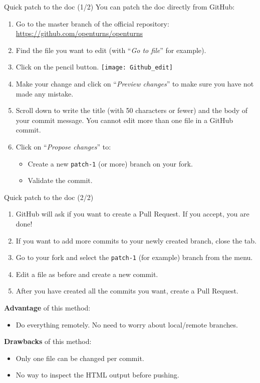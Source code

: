 \documentclass[8pt, handout]{beamer}
\begin{document}
\begin{frame}{Quick patch to the doc (1/2)}
You can patch the doc directly from GitHub:

\begin{enumerate}
    \item Go to the \alert{master} branch of the official repository: \url{https://github.com/openturns/openturns}
    \item Find the file you want to edit (with ``\alert{\emph{Go to file}}'' for example).
    \item Click on the pencil button.
    \texttt{[image: Github\_edit]}
    \item Make your change and click on ``\alert{\emph{Preview changes}}'' to make sure you have not made any mistake.
    \item Scroll down to write the title (with \alert{50 characters or fewer}) and the body of your commit message. You \alert{cannot edit more than one file} in a GitHub commit.
    \item Click on ``\alert{\emph{Propose changes}}'' to:
    \begin{itemize}
        \item Create a new \texttt{patch-1} (or more) branch on your fork.
        \item Validate the commit.
    \end{itemize}
    \setcounter{enumindex}{\value{enumi}}
\end{enumerate}
\end{frame}


\begin{frame}{Quick patch to the doc (2/2)}
\begin{enumerate}
    \setcounter{enumi}{\value{enumindex}}
    \item GitHub will ask if you want to create a \alert{Pull Request}. If you accept, you are done!
    \item If you want to \alert{add more commits} to your newly created branch, close the tab.
    \item Go to \alert{your fork} and select the \alert{\texttt{patch-1}} (for example) branch from the menu.
    \item \alert{Edit} a file as before and create a \alert{new commit}.
    \item After you have created all the commits you want, create a \alert{Pull Request}.
\end{enumerate}

\textbf{Advantage} of this method:
\begin{itemize}
    \item Do everything \alert{remotely}. No need to worry about local/remote branches.
\end{itemize}

\textbf{Drawbacks} of this method:
\begin{itemize}
    \item Only \alert{one file} can be changed \alert{per commit}.
    \item \alert{No way to inspect} the HTML output before pushing.
\end{itemize}
\end{frame}
\end{document}
